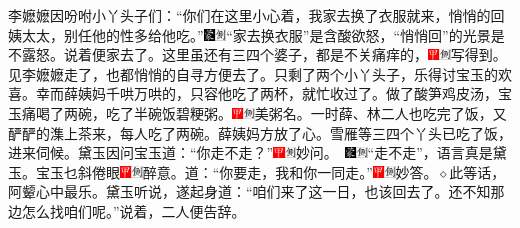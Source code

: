 李嬷嬷因吩咐小丫头子们：“你们在这里小心着，我家去换了衣服就来，悄悄的回姨太太，别任他的性多给他吃。”{\includegraphics[width=3mm]{../Images/00006}\includegraphics[width=3mm]{../Images/00011}\footnotesize \kaishu “家去换衣服”是含酸欲怒，“悄悄回”的光景是不露怒。}说着便家去了。这里虽还有三四个婆子，都是不关痛痒的，{\includegraphics[width=3mm]{../Images/00002}\includegraphics[width=3mm]{../Images/00011}\footnotesize \kaishu 写得到。}见李嬷嬷走了，也都悄悄的自寻方便去了。只剩了两个小丫头子，乐得讨宝玉的欢喜。幸而薛姨妈千哄万哄的，只容他吃了两杯，就忙收过了。做了酸笋鸡皮汤，宝玉痛喝了两碗，吃了半碗饭碧粳粥。{\includegraphics[width=3mm]{../Images/00002}\includegraphics[width=3mm]{../Images/00011}\footnotesize \kaishu 美粥名。}一时薛、林二人也吃完了饭，又酽酽的潗上茶来，每人吃了两碗。薛姨妈方放了心。雪雁等三四个丫头已吃了饭，进来伺候。黛玉因问宝玉道：“你走不走？”{{\includegraphics[width=3mm]{../Images/00002}\includegraphics[width=3mm]{../Images/00011}\footnotesize \kaishu 妙问。　}\includegraphics[width=3mm]{../Images/00006}\includegraphics[width=3mm]{../Images/00011}\footnotesize \kaishu “走不走”，语言真是黛玉。}宝玉乜斜倦眼{\includegraphics[width=3mm]{../Images/00002}\includegraphics[width=3mm]{../Images/00011}\footnotesize \kaishu 醉意。}道：“你要走，我和你一同走。”{\includegraphics[width=3mm]{../Images/00002}\includegraphics[width=3mm]{../Images/00011}\footnotesize \kaishu 妙答。{$\diamond$}此等话，阿颦心中最乐。}黛玉听说，遂起身道：“咱们来了这一日，也该回去了。还不知那边怎么找咱们呢。”说着，二人便告辞。

